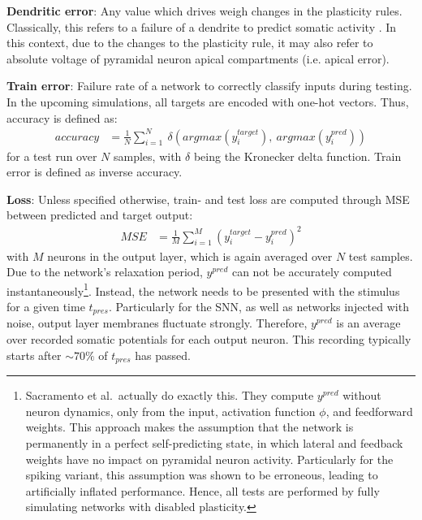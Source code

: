 \textbf{Dendritic error}: Any value which drives weigh changes in the plasticity rules. Classically, this refers to a
failure of a dendrite to predict somatic activity \citep{urbanczik2014learning}. In this context, due to the changes to
the plasticity rule, it may also refer to absolute voltage of pyramidal neuron apical compartments (i.e. apical error).
\newline

\textbf{Train error}: Failure rate of a network to correctly classify inputs during testing. In the upcoming
simulations, all targets are encoded with one-hot vectors. Thus, accuracy is defined as:
\begin{align*}
  accuracy & = \frac{1}{N} \sum_{i=1}^N \  \delta \left(argmax(y^{target}_i),\ argmax(y^{pred}_i) \right)
\end{align*}
for a test run over $N$ samples, with $\delta$ being the Kronecker delta function. Train error is defined as inverse
accuracy.\newline

\textbf{Loss}: Unless specified otherwise, train- and test loss are computed through MSE between predicted and
target output:
\begin{align*}
  MSE & = \frac{1}{M} \sum_{i=1}^M \left( y^{target}_i-y^{pred}_i \right)^2
\end{align*}
with $M$ neurons in the output layer, which is again averaged over $N$ test samples. Due to the network's relaxation
period, $y^{pred}$ can not be accurately computed instantaneously\footnote{Sacramento et al.\ actually do exactly this.
They compute $y^{pred}$ without neuron dynamics, only from the input, activation function $\phi$, and feedforward
weights. This approach makes the assumption that the network is permanently in a perfect self-predicting state, in which
lateral and feedback weights have no impact on pyramidal neuron activity. Particularly for the spiking variant, this
assumption was shown to be erroneous, leading to artificially inflated performance. Hence, all tests are performed by
fully simulating networks with disabled plasticity.}. Instead, the network needs to be presented with the stimulus for a
given time $t_{pres}$. Particularly for the SNN, as well as networks injected with noise, output layer membranes
fluctuate strongly. Therefore, $y^{pred}$ is an average over recorded somatic potentials for each output neuron. This
recording typically starts after $\sim 70\%$ of $t_{pres}$ has passed.